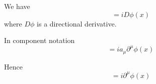 


\bigskip
We have
\begin{equation*}
[\phi(x),P]=iD\phi(x)
\end{equation*}
where $D\phi$ is a directional derivative.

\bigskip
In component notation
\begin{equation*}
[\phi(x),a_\mu P^\mu]=ia_\mu\partial^\mu\phi(x)
\end{equation*}

Hence
\begin{equation*}
[\phi(x),P^\mu]=i\partial^\mu\phi(x)
\end{equation*}


